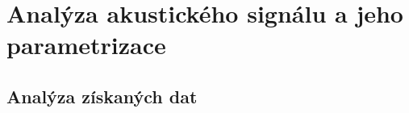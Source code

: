 \section{Analýza akustického signálu a jeho parametrizace}
\label{chap:construction:analysis}


\subsection{Analýza získaných dat}
\label{chap:construction:analysis:data}




